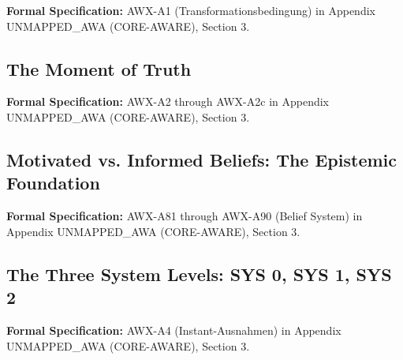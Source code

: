 \begin{cross-reference}
\textbf{Formal Specification:} AWX-A1 (Transformationsbedingung) in
Appendix UNMAPPED_AWA (CORE-AWARE), Section 3.
\end{cross-reference}

\subsection{The Moment of Truth}
\label{subsec:11-2-moment-of-truth}



\begin{cross-reference}
\textbf{Formal Specification:} AWX-A2 through AWX-A2c in
Appendix UNMAPPED_AWA (CORE-AWARE), Section 3.
\end{cross-reference}

\subsection{Motivated vs. Informed Beliefs: The Epistemic Foundation}
\label{subsec:11-3-beliefs}



\begin{cross-reference}
\textbf{Formal Specification:} AWX-A81 through AWX-A90 (Belief System) in
Appendix UNMAPPED_AWA (CORE-AWARE), Section 3.
\end{cross-reference}

\subsection{The Three System Levels: SYS 0, SYS 1, SYS 2}
\label{subsec:11-4-system-levels}



\begin{cross-reference}
\textbf{Formal Specification:} AWX-A4 (Instant-Ausnahmen) in
Appendix UNMAPPED_AWA (CORE-AWARE), Section 3.
\end{cross-reference}

